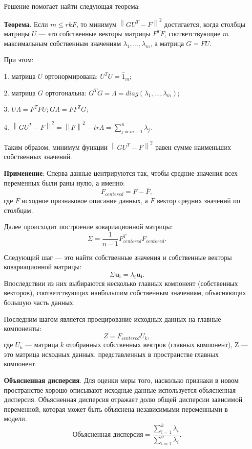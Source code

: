 Решение помогает найти следующая теорема:

\textbf{Теорема}. Если $m \leq rk F$, то минимум $\left\| GU^{T} - F \right\|^{2}$ достигается, когда столбцы матрицы $U$ — это собственные векторы матрицы $F^{T}F$, соответствующие $m$ максимальным собственным значениям $\lambda_1, ..., \lambda_m$, а матрица $G = FU$.

При этом:

1. матрица $U$ ортонормирована: $U^{T}U = \hat{1}_m$;

2. матрица $G$ ортогональна: $G^{T}G = \Lambda = diag(\lambda_1, ..., \lambda_m)$;

3. $U \Lambda = F^{T}FU; G\Lambda = FF^{T}G$;

4. $\left\| GU^{T} - F \right\|^{2} = \left\|F\right\|^{2} - tr \Lambda = \sum_{j = m+1}^{n} \lambda_j$.

Таким образом, минимум функции $\left\| GU^{T} - F \right\|^{2}$ равен сумме наименьших собственных значений.

\textbf{Применение}: Сперва данные центрируются так, чтобы средние значения всех переменных были раны нулю, а именно:
\begin{equation}
    F_{centered} = F - \bar{F},
\end{equation}
где $F$ исходное признаковое описание данных, а $\bar{F}$ вектор средних значений по столбцам.

Далее происходит построение ковариационной матрицы:
\begin{equation}
    \Sigma = \frac{1}{n-1}F_{centered}^{T}F_{centered}.
\end{equation}

Следующий шаг — это найти собственные значения и собственные векторы ковариационной матрицы:
\begin{equation}
    \Sigma \mathbf{u_i} = \lambda_i \mathbf{u_i}.
\end{equation}
Впоследствии из них выбираются несколько главных компонент (собственных векторов), соответствующих наибольшим собственным значениям, объясняющих большую часть данных.

Последним шагом является проецирование исходных данных на главные компоненты:
\begin{equation}
    Z = F_{centered}U_k,
\end{equation}
где $U_k$ — матрица $k$ отобранных собственных вектров (главных компонент), Z — это матрица исходных данных, представленных в пространстве главных компонент.

\textbf{Объясненная дисперсия}. Для оценки меры того, насколько признаки в новом пространстве хорошо описывают исходные данные используется объясненная дисперсия. Объясненная дисперсия отражает долю общей дисперсии зависимой переменной, которая может быть объяснена независимыми переменными в модели. 
\begin{equation}
    \text{Объясненная дисперсия} = \frac{\sum_{i=1}^{k}\lambda_i}{\sum_{i=1}^{n}\lambda_i}.
\end{equation}


